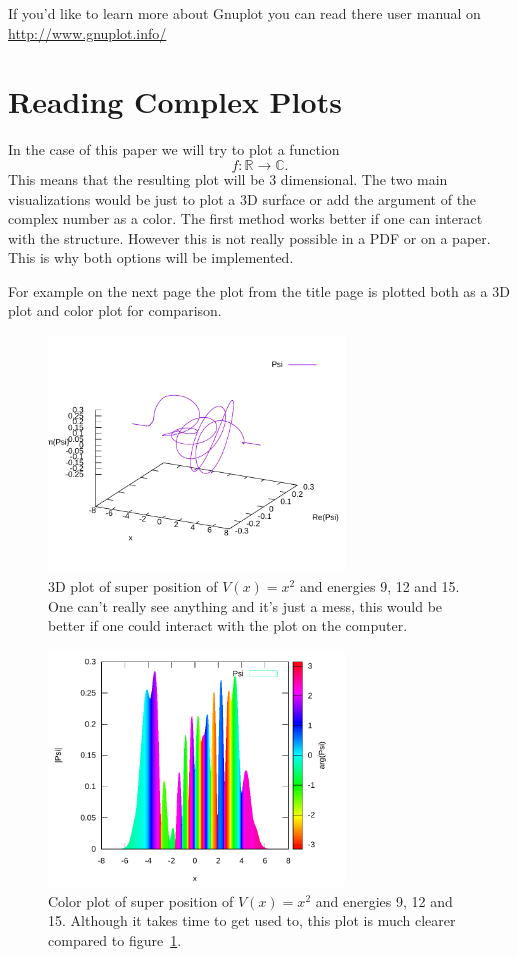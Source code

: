 \documentclass[11pt,DIV=10,final]{scrreprt} %
\begin{document}
If you'd like to learn more about Gnuplot you can read there user manual on \url{http://www.gnuplot.info/}

\section{Reading Complex Plots}\label{sec:complex-color-plots}
In the case of this paper we will try to plot a function
\[
  f: \mathbb{R} \to \mathbb{C}.
\]
This means that the resulting plot will be 3 dimensional. The two main visualizations would be just to plot a 3D surface or add the argument of the complex number as a color.
The first method works better if one can interact with the structure. However this is not really possible in a PDF or on a paper. This is why both options will be implemented.

For example on the next page the plot from the title page is plotted both as a 3D plot and color plot for comparison.
\pagebreak[4]
\begin{figure}[H]
  \centering
  \includegraphics[width=0.7\textwidth]{plots/super-square-9-12-15-3d.pdf}
  \caption{3D plot of super position of $V(x) = x^2$ and energies 9, 12 and 15. One can't really see anything and it's just a mess, this would be better if one could interact with the plot
  on the computer.}\label{fig:title-wave-3d}
\end{figure}
\begin{figure}[H]
  \centering
  \includegraphics[width=0.7\textwidth]{plots/super-square-9-12-15-color.pdf}
  \caption{Color plot of super position of $V(x) = x^2$ and energies 9, 12 and 15. Although it takes time to get used to, this plot is much clearer compared to figure~\ref{fig:title-wave-3d}.}
\end{figure}
\end{document}
